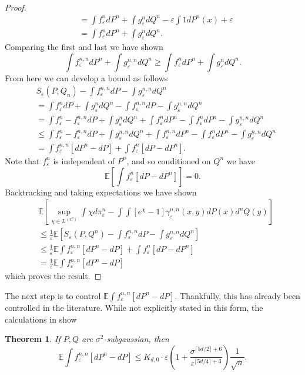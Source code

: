 \documentclass{article}
\newtheorem{theorem}{Theorem}
\theoremstyle{definition}
\newcommand{\feps}{f_\varepsilon}
\newcommand{\geps}{g_\varepsilon}
\begin{document}
\begin{proof}
\begin{align*}
        &= \int \feps^n dP^n + \int \geps^n dQ^n - \varepsilon \int 1 dP^n(x) + \varepsilon \\
        &= \int \feps^n dP^n + \int \geps^n dQ^n.
    \end{align*}
    Comparing the first and last we have shown
    \begin{equation*}
        \int \feps^{n,n} dP^n + \int \geps^{n,n}dQ^n \geq \int \feps^n dP^n + \int \geps^n dQ^n.
    \end{equation*}
    From here we can develop a bound as follows
    \begin{align*}
        &S_\varepsilon(P,Q_n) - \int \feps^{n,n} dP - \int \geps^{n,n} dQ^n \\
        &= \int \feps^{n} dP + \int \geps^{n} dQ^n - \int \feps^{n,n} dP - \int \geps^{n,n} dQ^n \\
        &= \int \feps^n - \feps^{n,n} dP + \int \geps^n dQ^n + \int \feps^n dP^n - \int \feps^n dP^n - \int \geps^{n,n} dQ^n \\
        &\leq \int \feps^n - \feps^{n,n} dP + \int \geps^{n,n} dQ^n + \int \feps^{n,n} dP^n - \int \feps^n dP^n - \int \geps^{n,n} dQ^n \\
        &= \int \feps^{n,n} [dP^n - dP] + \int \feps^{n} [dP - dP^n].  
    \end{align*}
    Note that $\feps^n$ is independent of $P^n$, and so conditioned on $Q^n$ we have
    \begin{equation*}
        \mathbb{E}\left[\int \feps^{n} [dP - dP^n] \right ] = 0.
    \end{equation*}
    Backtracking and taking expectations we have shown 
    \begin{align*}
         &\mathbb{E}\left [ \sup_{\chi \in L^(\pi^n_\varepsilon)} \int \chi d\pi_\varepsilon^n - \int \int \left [ e^{\chi} - 1\right ] \gamma_\varepsilon^{n,n}(x,y) dP(x)d^nQ(y) \right ] \\
         &\leq \frac{1}{\varepsilon} \mathbb{E}  \left [ S_\varepsilon(P,Q^n) - \int \feps^{n,n} dP - \int \geps^{n,n} dQ^n \right ] \\
         &\leq \frac{1}{\varepsilon}\mathbb{E}\int \feps^{n,n} [dP^n - dP] + \int \feps^{n} [dP - dP^n]  \\
         &= \frac{1}{\varepsilon}\mathbb{E}\int \feps^{n,n} [dP^n - dP]
    \end{align*}
    which proves the result.
\end{proof}

The next step is to control $\mathbb{E}\int \feps^{n,n}[dP^n - dP]$. Thankfully, this has already been controlled in the literature. While not explicitly stated in this form, the calculations in \cite{mena2019statistical} show
\begin{theorem} If $P,Q$ are $\sigma^2$-subgaussian, then 
    \begin{equation*}
        \mathbb{E}\int \feps^{n,n} [dP^n - dP] \leq K_{d,0} \cdot \varepsilon \left ( 1 + \frac{\sigma^{\lceil 5d/2\rceil + 6}}{\varepsilon^{\lceil 5d / 4 \rceil + 3}}\right ) \frac{1}{\sqrt{n}}.
    \end{equation*}
\end{theorem}
\end{document}
